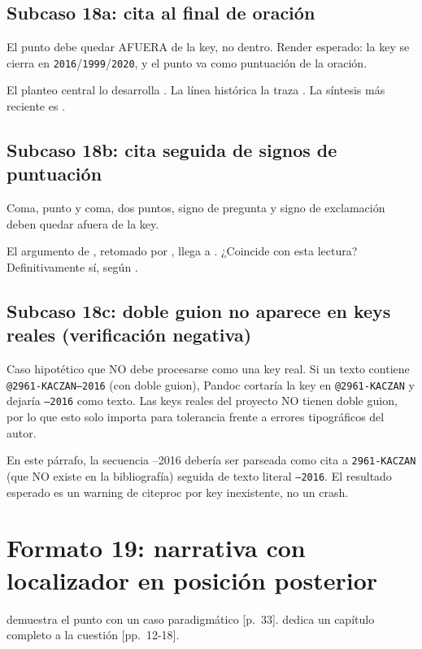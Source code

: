 \documentclass{article}
\begin{document}
\subsection{Subcaso 18a: cita al final de oración}
El punto debe quedar AFUERA de la key, no dentro. Render esperado: la key se cierra en \texttt{2016}/\texttt{1999}/\texttt{2020}, y el punto va como puntuación de la oración.

El planteo central lo desarrolla \textcite{2961-KACZAN2016}. La línea histórica la traza \textcite{3041-PINEAU1999}. La síntesis más reciente es \textcite{3036-ORBUCH2020}.


\subsection{Subcaso 18b: cita seguida de signos de puntuación}
Coma, punto y coma, dos puntos, signo de pregunta y signo de exclamación deben quedar afuera de la key.

El argumento de \textcite{2961-KACZAN2016}, retomado por \textcite{3041-PINEAU1999}, llega a \textcite{3036-ORBUCH2020}. ¿Coincide \textcite{2961-KACZAN2016} con esta lectura? Definitivamente sí, según \textcite{3036-ORBUCH2020}.


\subsection{Subcaso 18c: doble guion no aparece en keys reales (verificación negativa)}
Caso hipotético que NO debe procesarse como una key real. Si un texto contiene \texttt{@2961-KACZAN--2016} (con doble guion), Pandoc cortaría la key en \texttt{@2961-KACZAN} y dejaría \texttt{--2016} como texto. Las keys reales del proyecto NO tienen doble guion, por lo que esto solo importa para tolerancia frente a errores tipográficos del autor.

En este párrafo, la secuencia \textcite{2961-KACZAN}–2016 debería ser parseada como cita a \texttt{2961-KACZAN} (que NO existe en la bibliografía) seguida de texto literal \texttt{--2016}. El resultado esperado es un warning de citeproc por key inexistente, no un crash.



\section{Formato 19: narrativa con localizador en posición posterior}
\textcite{2961-KACZAN2016} demuestra el punto con un caso paradigmático [p. 33]. \textcite{3036-ORBUCH2020} dedica un capítulo completo a la cuestión [pp. 12-18].
\end{document}
